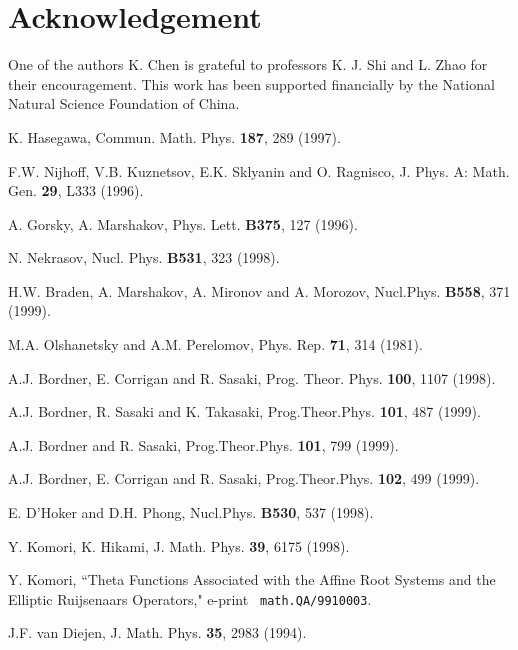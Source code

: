 \documentclass[a4paper,12pt]{article}
\begin{document}
\section*{Acknowledgement}

One of the authors K. Chen is grateful to professors K. J. Shi and L. Zhao
for their encouragement. This work has been supported financially by the
National Natural Science Foundation of China.

\vspace{1pt}

\vspace{1pt}

\begin{thebibliography}{99}
  K. Hasegawa, Commun. Math. Phys. \textbf{187}, 289 (1997).

	F.W. Nijhoff, V.B. Kuznetsov, E.K. Sklyanin and O.
Ragnisco, J. Phys. A: Math. Gen. \textbf{29}, L333 (1996).

  A. Gorsky, A. Marshakov, Phys. Lett. \textbf{B375}, 127 (1996).

  N. Nekrasov, Nucl. Phys. \textbf{B531}, 323 (1998).

	H.W. Braden, A. Marshakov, A. Mironov and A. Morozov,
Nucl.Phys. \textbf{B558}, 371 (1999).

  M.A. Olshanetsky and A.M. Perelomov, Phys. Rep.
\textbf{71}, 314 (1981).

  A.J. Bordner, E. Corrigan and R. Sasaki, Prog. Theor. Phys.
\textbf{100}, 1107 (1998).

	A.J. Bordner, R. Sasaki and K. Takasaki, Prog.Theor.Phys.
\textbf{101}, 487 (1999).

	A.J. Bordner and R. Sasaki, Prog.Theor.Phys.
\textbf{101}, 799 (1999).

	A.J. Bordner, E. Corrigan and R. Sasaki, Prog.Theor.Phys.
\textbf{102}, 499 (1999).

  E. D'Hoker and D.H. Phong, Nucl.Phys. \textbf{B530}, 537
(1998).

  Y. Komori, K. Hikami, J. Math. Phys. \textbf{39}, 6175 (1998).

  Y. Komori, ``Theta Functions Associated with the Affine Root
Systems and the Elliptic Ruijsenaars Operators," e-print \texttt{
math.QA/9910003}.

  J.F. van Diejen, J. Math. Phys. \textbf{35}, 2983 (1994).


\end{thebibliography}
\end{document}
